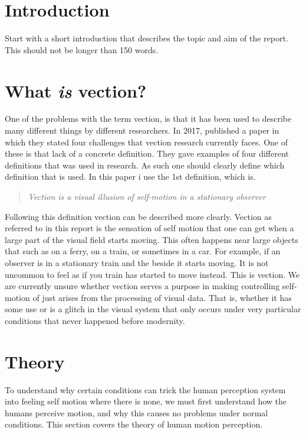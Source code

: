 \documentclass[11pt,a4paper,oneside,table,xcdraw]{article}
\begin{document}
	\section{Introduction}
	Start with a short introduction that describes the topic and aim of the report. This should not be longer than 150 words.
	\section{What \textit{is} vection?}

	One of the problems with the term vection, is that it has been used to describe many different things by different researchers. In 2017, \cite{challenges} published a paper in which they stated four challenges that vection research currently faces. One of these is that lack of a concrete definition. They gave examples of four different definitions that was used in research. As such one should clearly define which definition that is used. In this paper i use the 1st definition, which is.
	\begin{quote}
\textit{Vection is a visual illusion of self-motion in a stationary observer}
	\end{quote}
	Following this definition vection can be described more clearly. Vection as referred to in this report is the sensation of self motion that one can get when a large part of the visual field starts moving. This often happens near large objects that such as on a ferry, on a train, or sometimes in a car. For example, if an observer is in a stationary train and the beside it starts moving. It is not uncommon to feel as if you train has started to move instead. This is vection. We are currently unsure whether vection serves a purpose in making controlling self-motion of just arises from the processing of visual data. That is, whether it has some use or is a glitch in the visual system that only occurs under very particular conditions that never happened before modernity. 
	\section{Theory}
	To understand why certain conditions can trick the human perception system into feeling self motion where there is none, we must first understand how the humans perceive motion, and why this causes no problems under normal conditions. This section covers the theory of human motion perception. 
\end{document}
